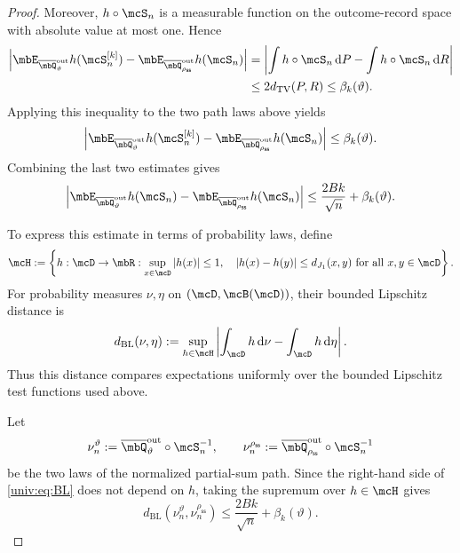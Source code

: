 \documentclass[a4paper]{article}
\numberwithin{equation}{section}   %
\theoremstyle{plain}   %
\theoremstyle{plain}   %
\theoremstyle{examplestyle}
\newcommand{\s}{\rho_{\mathsf{ss}}}     %
\newcommand{\dee}{\mathrm{d}}           %
\newcommand{\TV}{d_{\mathrm{TV}}}
\begin{document}
\begin{proof}
    Moreover, $h\circ\mcS_n$ is a measurable function on the outcome-record space with absolute value at most one. 
    Hence
    \[
        \begin{aligned}
            \left|
                \mbE_{\overline\mbQ^{\mathrm{out}}_\vartheta}
                    h(\mcS_n^{[k]})
                -
                \mbE_{\overline\mbQ^{\mathrm{out}}_{\s}}
                    h(\mcS_n)
            \right|
            &=
            \left|
                \int h\circ\mcS_n\,\dee P
                -
                \int h\circ\mcS_n\,\dee R
            \right|\\
            &\le 2\TV(P,R)
            \le \beta_k(\vartheta).
        \end{aligned}
    \]
    Applying this inequality to the two path laws above yields
    \[
        \left|
            \mbE_{\overline\mbQ^{\mathrm{out}}_\vartheta} h(\mcS_n^{[k]})
            -
            \mbE_{\overline\mbQ^{\mathrm{out}}_{\s}}h(\mcS_n)
        \right|
        \le\beta_k(\vartheta).
    \]
    Combining the last two estimates gives
    \begin{equation}
    \label{univ:eq:BL}
        \left|
            \mbE_{\overline\mbQ^{\mathrm{out}}_\vartheta} h(\mcS_n)
            -
            \mbE_{\overline\mbQ^{\mathrm{out}}_{\s}}h(\mcS_n)
        \right|
        \le
        \frac{2Bk}{\sqrt n}+\beta_k(\vartheta).
    \end{equation}

    To express this estimate in terms of probability laws, define
    \[
        \mcH:=
        \left\{
            h:\mcD\to\mbR:
            \sup_{x\in\mcD}|h(x)|\le1,\quad
            |h(x)-h(y)|\le d_{J_1}(x,y)
            \text{ for all }x,y\in\mcD
        \right\}.
    \]
    For probability measures $\nu,\eta$ on $(\mcD,\mcB(\mcD))$, their bounded Lipschitz distance is
    \[
        d_{\mathrm{BL}}(\nu,\eta)
        :=
        \sup_{h\in\mcH}
        \left|
            \int_{\mcD}h\,\dee\nu
            -\int_{\mcD}h\,\dee\eta
        \right|.
    \]
    Thus this distance compares expectations uniformly over the bounded Lipschitz test functions used above.
    
    Let
    \[
        \nu_n^\vartheta
        :=
        \overline\mbQ^{\mathrm{out}}_\vartheta
            \circ\mcS_n^{-1},
        \qquad
        \nu_n^{\s}
        :=
        \overline\mbQ^{\mathrm{out}}_{\s}
            \circ\mcS_n^{-1}
    \]
    be the two laws of the normalized partial-sum path.
    Since the right-hand side of \eqref{univ:eq:BL} does not depend on $h$, taking the supremum over $h\in\mcH$ gives
    \[
        d_{\mathrm{BL}}(\nu_n^\vartheta,\nu_n^{\s})
        \le
        \frac{2Bk}{\sqrt n}+\beta_k(\vartheta).
    \]
    

\end{proof}
\end{document}
